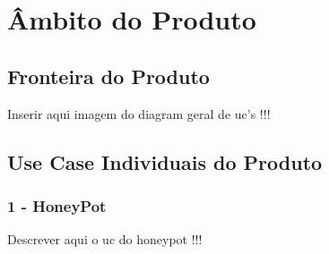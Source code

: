 \section{Âmbito do Produto}
\subsection{Fronteira do Produto}

Inserir aqui imagem do diagram geral de uc's !!!

\subsection{Use Case Individuais do Produto}


\subsubsection{\textbf{1 - HoneyPot}}

Descrever aqui o uc do honeypot !!!

